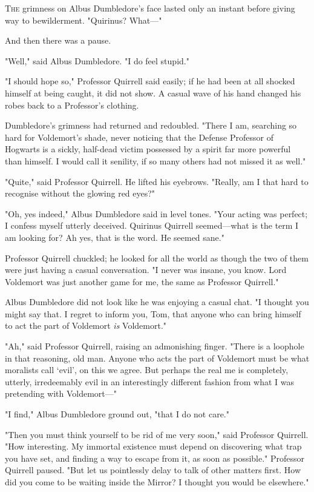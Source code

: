 
\lettrine{T}{he} grimness on Albus Dumbledore's face lasted only an instant before giving
way to bewilderment. "Quirinus? What---"

And then there was a pause.

"Well," said Albus Dumbledore. "I do feel stupid."

"I should hope so," Professor Quirrell said easily; if he had been at all
shocked himself at being caught, it did not show. A casual wave of his hand
changed his robes back to a Professor's clothing.

Dumbledore's grimness had returned and redoubled. "There I am, searching so
hard for Voldemort's shade, never noticing that the Defense Professor of
Hogwarts is a sickly, half-dead victim possessed by a spirit far more powerful
than himself. I would call it senility, if so many others had not missed it as
well."

"Quite," said Professor Quirrell. He lifted his eyebrows. "Really, am I that
hard to recognise without the glowing red eyes?"

"Oh, yes indeed," Albus Dumbledore said in level tones. "Your acting was
perfect; I confess myself utterly deceived. Quirinus Quirrell seemed---what is
the term I am looking for? Ah yes, that is the word. He seemed sane."

Professor Quirrell chuckled; he looked for all the world as though the two of
them were just having a casual conversation. "I never was insane, you know.
Lord Voldemort was just another game for me, the same as Professor Quirrell."

Albus Dumbledore did not look like he was enjoying a casual chat. "I thought
you might say that. I regret to inform you, Tom, that anyone who can bring
himself to act the part of Voldemort \emph{is} Voldemort."

"Ah," said Professor Quirrell, raising an admonishing finger. "There is a
loophole in that reasoning, old man. Anyone who acts the part of Voldemort must
be what moralists call `evil', on this we agree. But perhaps the real me is
completely, utterly, irredeemably evil in an interestingly different fashion
from what I was pretending with Voldemort---"

"I find," Albus Dumbledore ground out, "that I do not care."

"Then you must think yourself to be rid of me very soon," said Professor
Quirrell. "How interesting. My immortal existence must depend on discovering
what trap you have set, and finding a way to escape from it, as soon as
possible." Professor Quirrell paused. "But let us pointlessly delay to talk of
other matters first. How did you come to be waiting inside the Mirror? I
thought you would be elsewhere."

